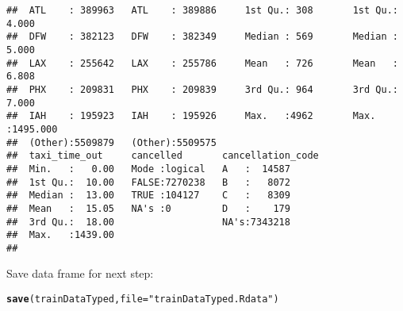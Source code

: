 \documentclass{article}\usepackage[]{graphicx}\usepackage[]{color}
\makeatletter
\newcommand{\hlstr}[1]{\textcolor[rgb]{0.192,0.494,0.8}{#1}}%
\newcommand{\hlstd}[1]{\textcolor[rgb]{0.345,0.345,0.345}{#1}}%
\newcommand{\hlkwc}[1]{\textcolor[rgb]{0.333,0.667,0.333}{#1}}%
\newcommand{\hlkwd}[1]{\textcolor[rgb]{0.737,0.353,0.396}{\textbf{#1}}}%
\newenvironment{kframe}{%
 \def\at@end@of@kframe{}%
 \ifinner\ifhmode%
  \def\at@end@of@kframe{\end{minipage}}%
  \begin{minipage}{\columnwidth}%
 \fi\fi%
 \def\FrameCommand##1{\hskip\@totalleftmargin \hskip-\fboxsep
 \colorbox{shadecolor}{##1}\hskip-\fboxsep
     \hskip-\linewidth \hskip-\@totalleftmargin \hskip\columnwidth}%
 \MakeFramed {\advance\hsize-\width
   \@totalleftmargin\z@ \linewidth\hsize
   \@setminipage}}%
 {\par\unskip\endMakeFramed%
 \at@end@of@kframe}
\newenvironment{knitrout}{}{} %
\makeatother
\begin{document}
\begin{knitrout}
\begin{kframe}
\begin{verbatim}
##  ATL    : 389963   ATL    : 389886     1st Qu.: 308       1st Qu.:   4.000  
##  DFW    : 382123   DFW    : 382349     Median : 569       Median :   5.000  
##  LAX    : 255642   LAX    : 255786     Mean   : 726       Mean   :   6.808  
##  PHX    : 209831   PHX    : 209839     3rd Qu.: 964       3rd Qu.:   7.000  
##  IAH    : 195923   IAH    : 195926     Max.   :4962       Max.   :1495.000  
##  (Other):5509879   (Other):5509575                                          
##  taxi_time_out     cancelled       cancellation_code
##  Min.   :   0.00   Mode :logical   A   :  14587     
##  1st Qu.:  10.00   FALSE:7270238   B   :   8072     
##  Median :  13.00   TRUE :104127    C   :   8309     
##  Mean   :  15.05   NA's :0         D   :    179     
##  3rd Qu.:  18.00                   NA's:7343218     
##  Max.   :1439.00                                    
## 
\end{verbatim}
\end{kframe}
\end{knitrout}

Save data frame for next step:
\begin{knitrout}
\color{fgcolor}\begin{kframe}
\begin{alltt}
\hlkwd{save}\hlstd{(trainDataTyped,} \hlkwc{file}\hlstd{=}\hlstr{"trainDataTyped.Rdata"}\hlstd{)}
\end{alltt}
\end{kframe}
\end{knitrout}


\end{document}
